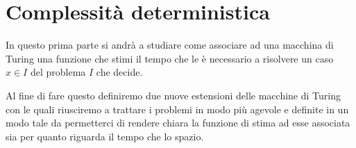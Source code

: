 \chapter{Complessità deterministica}

In questo prima parte si andrà a studiare come associare ad una
macchina di Turing una funzione che stimi il tempo che le è
necessario a risolvere un caso $x \in I$ del problema $I$ che
decide.

Al fine di fare questo definiremo due nuove estensioni delle
macchine di Turing con le quali riusciremo a trattare i problemi
in modo più agevole e definite in un modo tale da permetterci
di rendere chiara la funzione di stima ad esse associata sia
per quanto riguarda il tempo che lo spazio.
